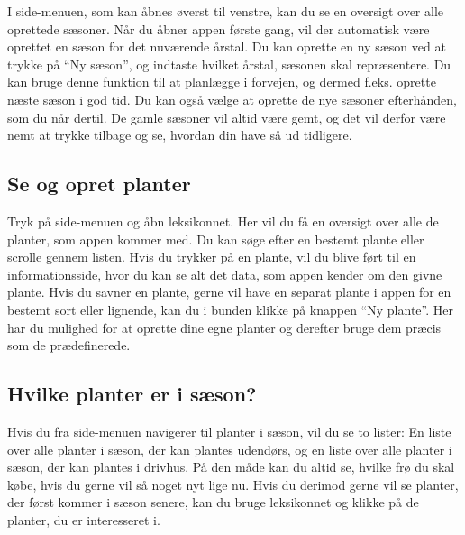 \begin{minipage}{0.55\textwidth}
I side-menuen, som kan åbnes øverst til venstre, kan du se en oversigt over alle oprettede sæsoner. Når du åbner appen første gang, vil der automatisk være oprettet en sæson for det nuværende årstal. Du kan oprette en ny sæson ved at trykke på ``Ny sæson'', og indtaste hvilket årstal, sæsonen skal repræsentere. Du kan bruge denne funktion til at planlægge i forvejen, og dermed f.eks. oprette næste sæson i god tid. Du kan også vælge at oprette de nye sæsoner efterhånden, som du når dertil. De gamle sæsoner vil altid være gemt, og det vil derfor være nemt at trykke tilbage og se, hvordan din have så ud tidligere.
\end{minipage} 

\subsection{Se og opret planter}
Tryk på side-menuen og åbn leksikonnet. Her vil du få en oversigt over alle de planter, som appen kommer med. Du kan søge efter en bestemt plante eller scrolle gennem listen. Hvis du trykker på en plante, vil du blive ført til en informationsside, hvor du kan se alt det data, som appen kender om den givne plante. Hvis du savner en plante, gerne vil have en separat plante i appen for en bestemt sort eller lignende, kan du i bunden klikke på knappen ``Ny plante''. Her har du mulighed for at oprette dine egne planter og derefter bruge dem præcis som de prædefinerede.

\subsection{Hvilke planter er i sæson?}
Hvis du fra side-menuen navigerer til planter i sæson, vil du se to lister: En liste over alle planter i sæson, der kan plantes udendørs, og en liste over alle planter i sæson, der kan plantes i drivhus. På den måde kan du altid se, hvilke frø du skal købe, hvis du gerne vil så noget nyt lige nu. 
Hvis du derimod gerne vil se planter, der først kommer i sæson senere, kan du bruge leksikonnet og klikke på de planter, du er interesseret i.

